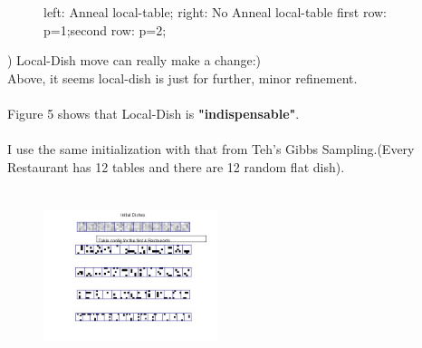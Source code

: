 \documentclass{article}
\begin{document}
\begin{spacing}{1.1}
\begin{figure}
    \caption{left: Anneal local-table; right: No Anneal local-table   first row: p=1;second row: p=2; }
    \label{fig:by:table} 
\end{figure}
) Local-Dish move can really make a change:)\\
Above, it seems local-dish is just for further, minor refinement.\\ \\
Figure 5 shows that Local-Dish is {\bf"indispensable"}.\\ \\
I use the same initialization with that from Teh's Gibbs Sampling.(Every Restaurant has 12 tables and there are 12 random flat dish).\\
\begin{figure}
 \centering
\includegraphics[width=2in,height=2in]{Gibbs_init.jpg}
    \label{fig:by:table} 
\end{figure}


\end{spacing}
\end{document}
